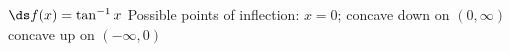 {$\ds f(x) = \tan^{-1} x$
}
{Possible points of inflection: $x=0$;
concave down on $(0,\infty)$
concave up on $(-\infty,0)$
}

